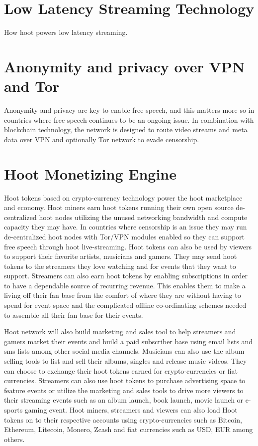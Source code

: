 \documentclass{article}
\begin{document}
\section{Low Latency Streaming Technology}
How hoot powers low latency streaming.

\section{Anonymity and privacy over VPN and Tor}
Anonymity and privacy are key to enable free speech, and this matters
more so in countries where free speech continues to be an ongoing
issue. In combination with blockchain technology, the network is
designed to route video streams and meta data over VPN and optionally
Tor network to evade censorship.

\section{Hoot Monetizing Engine}
Hoot tokens based on crypto-currency technology power the hoot
marketplace and economy. Hoot miners earn hoot tokens running their own open source
de-centralized hoot nodes utilizing the unused networking bandwidth
and compute capacity they may have. In countries where censorship is an issue they
may run de-centralized hoot nodes with Tor/VPN modules enabled so they can
support free speech through hoot
live-streaming. Hoot tokens can also be used by viewers to support their favorite artists,
musicians and gamers. They may send hoot tokens to the
streamers they love watching and for events that they want to
support. Streamers can also earn hoot tokens by enabling subscriptions in order to have a
dependable source of recurring revenue. This enables them to make a
living off their fan base from the comfort of where they are without
having to spend for event space and the complicated offline
co-ordinating schemes needed to assemble all their fan base for their events.

 Hoot network will also build marketing and sales tool to help
streamers and gamers market their 
events and build a paid subscriber base using email lists and sms lists among other social media
channels. 
Musicians can also use the album selling tools to list and sell
their albums, singles and release music videos. They can
choose to exchange their hoot tokens earned for crypto-currencies or fiat currencies.
 Streamers can also use hoot tokens to
purchase advertising space to feature events or utilize the marketing and sales
tools to drive more viewers to their
streaming events such as an album launch, book launch, movie launch or
e-sports gaming event. Hoot miners, streamers and viewers can also load Hoot
tokens on to their respective accounts using crypto-currencies such as Bitcoin,
Ethereum, Litecoin, Monero, Zcash and fiat currencies such as USD, EUR among others.
\end{document}
